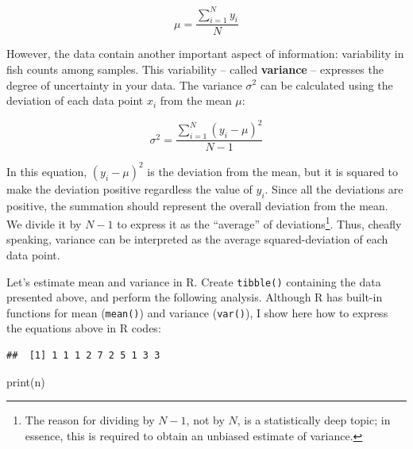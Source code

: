 \documentclass[
]{book}
\newenvironment{Shaded}{\begin{snugshade}}{\end{snugshade}}
\newcommand{\CommentTok}[1]{\textcolor[rgb]{0.56,0.35,0.01}{\textit{#1}}}
\newcommand{\FunctionTok}[1]{\textcolor[rgb]{0.00,0.00,0.00}{#1}}
\newcommand{\NormalTok}[1]{#1}
\newcommand{\OtherTok}[1]{\textcolor[rgb]{0.56,0.35,0.01}{#1}}
\newcommand{\SpecialCharTok}[1]{\textcolor[rgb]{0.00,0.00,0.00}{#1}}
\begin{document}
\[
\mu = \frac{\sum_{i=1}^N y_i}{N}
\]

However, the data contain another important aspect of information: variability in fish counts among samples. This variability -- called \textbf{variance} -- expresses the degree of uncertainty in your data. The variance \(\sigma^2\) can be calculated using the deviation of each data point \(x_i\) from the mean \(\mu\):

\[
\sigma^2 = \frac{\sum_{i=1}^N (y_i - \mu)^2}{N - 1}
\]

In this equation, \((y_i - \mu)^2\) is the deviation from the mean, but it is squared to make the deviation positive regardless the value of \(y_i\). Since all the deviations are positive, the summation should represent the overall deviation from the mean. We divide it by \(N-1\) to express it as the ``average'' of deviations\footnote{The reason for dividing by \(N-1\), not by \(N\), is a statistically deep topic; in essence, this is required to obtain an unbiased estimate of variance.}. Thus, cheafly speaking, variance can be interpreted as the average squared-deviation of each data point.

Let's estimate mean and variance in R. Create \texttt{tibble()} containing the data presented above, and perform the following analysis. Although R has built-in functions for mean (\texttt{mean()}) and variance (\texttt{var()}), I show here how to express the equations above in R codes:

\begin{Shaded}
\end{Shaded}

\begin{verbatim}
##  [1] 1 1 1 2 7 2 5 1 3 3
\end{verbatim}

\begin{Shaded}
\begin{Highlighting}[]
\FunctionTok{print}\NormalTok{(n)}
\end{Highlighting}
\end{Shaded}
\end{document}
